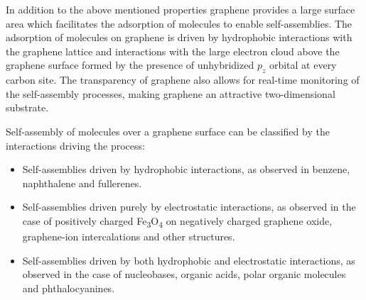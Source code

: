 In addition to the above mentioned properties graphene provides a large surface area which facilitates the adsorption of molecules to enable self-assemblies. The adsorption of molecules on graphene is driven by hydrophobic interactions with the graphene lattice and interactions with the large electron cloud above the graphene surface formed by the presence of unhybridized $p_z$ orbital at every carbon site. The transparency of graphene also allows for real-time monitoring of the self-assembly processes, making graphene an attractive two-dimensional substrate.\supercite{xu_coadsorption_2006, zhao_investigating_2016, hason_arrangements_2023, xu_directional_2021, garah_guanosine-based_2015, hughes_adsorption_2017, hassan_interactions_2014, hsun_su_electrostatic_2011} 

Self-assembly of molecules over a graphene surface can be classified by the interactions driving the process:
\begin{itemize}
    \item Self-assemblies driven by hydrophobic interactions, as observed in benzene\supercite{alzahrani_first-principles_2010,shen_adsorption_2021,hassan_interactions_2014,wang_substituent_2014}, naphthalene and fullerenes\supercite{lu_using_2012}.
    \item Self-assemblies driven purely by electrostatic interactions, as observed in the case of positively charged Fe\textsubscript{3}O\textsubscript{4} on negatively charged graphene oxide\supercite{yang_electrostatic_2020}, graphene-ion intercalations\supercite{lee_li_2012,yoon_chloroaluminate_2022,yu_reversible_2023,ji_lithium_2019} and other structures\supercite{groger_step-wise_2009}. 
    \item Self-assemblies driven by both hydrophobic and electrostatic interactions, as observed in the case of nucleobases\supercite{heckl_two-dimensional_1991,freund_structure_1997,mu_temperature-dependent_2013,gottarelli_self-assembly_2000,ciesielski_nanopatterning_2010}, organic acids\supercite{rochefort_interaction_2009,griessl_self-assembled_2002}, polar organic molecules\supercite{song_noncovalent_2016,su_composites_2009} and phthalocyanines\supercite{jarvinen_self-assembly_2014,hamalainen_self-assembly_2012}.
\end{itemize}

